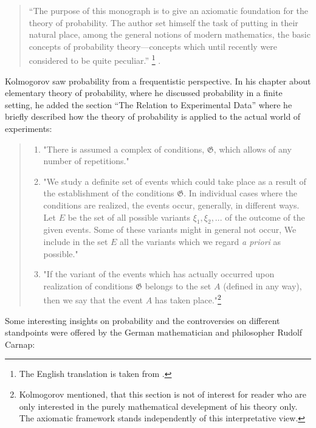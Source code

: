 \documentclass[
]{report}
\theoremstyle{definition}
\begin{document}
\begin{quote}
“The purpose of this monograph is to give an axiomatic foundation for the theory of probability. The author set himself the task of putting in their natural place, among the general notions of modern mathematics, the basic concepts of probability theory—concepts which until recently were considered to be quite peculiar.” \footnote{The English translation is taken from \cite[p. 15]{a_n_kolmogorov_foundations_1950}.} \cite[p.15]{noauthor_kolmogoroff_nodate}. 
\end{quote}

Kolmogorov saw probability from a frequentistic perspective. In his
chapter about elementary theory of probability, where he discussed
probability in a finite setting, he added the section ``The Relation to
Experimental Data'' where he briefly described how the theory of
probability is applied to the actual world of experiments:

\begin{quote}
\begin{enumerate}[label=\arabic*)]
  \item "There is assumed a complex of conditions, $\mathfrak{G}$, which allows of any number of repetitions."
  \item "We study a definite set of events which could take place as a result of the establishment of the conditions $\mathfrak{G}$. In individual cases where the conditions are realized, the events occur, generally, in different ways. Let $E$ be the set of all possible variants $\xi_1, \xi_2, ...$ of the outcome of the given events. Some of these variants might in general not occur, We include in the set $E$ all the variants which we regard \textit{a priori} as possible."
  \item "If the variant of the events which has actually occurred upon realization of conditions $\mathfrak{G}$ belongs to the set $A$ (defined in any way), then we say that the event $A$ has taken place."\footnote{Kolmogorov mentioned, that this section is not of interest for reader who are only interested in the purely mathematical develepment of his theory only. The axiomatic framework stands independently of this interpretative view.}
\end{enumerate}
\end{quote}

Some interesting insights on probability and the controversies on
different standpoints were offered by the German mathematician and
philosopher Rudolf Carnap:
\end{document}

